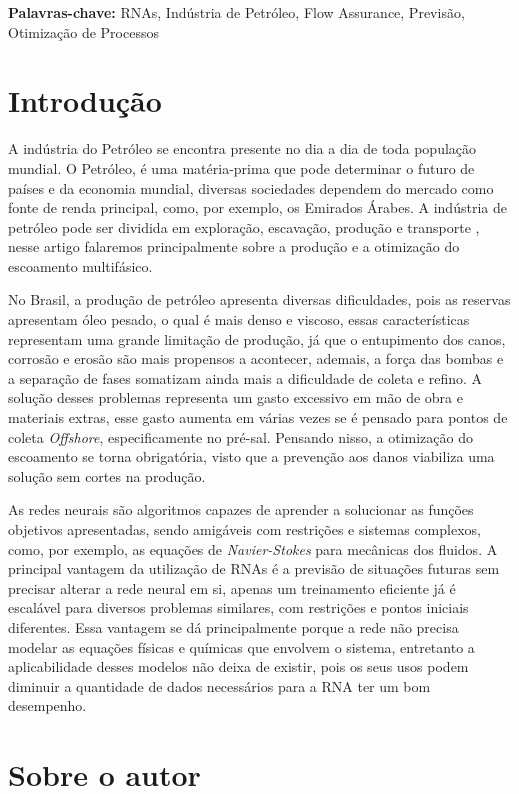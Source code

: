 \documentclass{article}[12pt, openright, oneside, a4paper, portuguese]
\begin{document}
    \textbf{Palavras-chave:} RNAs, Indústria de Petróleo, Flow Assurance, Previsão, Otimização de Processos

\section{Introdução}

    A indústria do Petróleo se encontra presente no dia a dia de toda população mundial. O Petróleo, é uma matéria-prima que pode determinar o futuro de países e da economia mundial, diversas sociedades dependem do mercado como fonte de renda principal, como, por exemplo, os Emirados Árabes. A indústria de petróleo pode ser dividida em exploração, escavação, produção e transporte \cite{Solomon2024}, nesse artigo falaremos principalmente sobre a produção e a otimização do escoamento multifásico.
    
    No Brasil, a produção de petróleo apresenta diversas dificuldades, pois as reservas apresentam óleo pesado, o qual é mais denso e viscoso, essas características representam uma grande limitação de produção, já que o entupimento dos canos, corrosão e erosão são mais propensos a acontecer, ademais, a força das bombas e a separação de fases somatizam ainda mais a dificuldade de coleta e refino. A solução desses problemas representa um gasto excessivo em mão de obra e materiais extras, esse gasto aumenta em várias vezes se é pensado para pontos de coleta \textit{Offshore}, especificamente no pré-sal. Pensando nisso, a otimização do escoamento se torna obrigatória, visto que a prevenção aos danos viabiliza uma solução sem cortes na produção.
    
    As redes neurais são algoritmos capazes de aprender a solucionar as funções objetivos apresentadas, sendo amigáveis com restrições e sistemas complexos, como, por exemplo, as equações de \textit{Navier-Stokes} para mecânicas dos fluidos. A principal vantagem da utilização de RNAs é a previsão de situações futuras sem precisar alterar a rede neural em si, apenas um treinamento eficiente já é escalável para diversos problemas similares, com restrições e pontos iniciais diferentes. Essa vantagem se dá principalmente porque a rede não precisa modelar as equações físicas e químicas que envolvem o sistema, entretanto a aplicabilidade desses modelos não deixa de existir, pois os seus usos podem diminuir a quantidade de dados necessários para a RNA ter um bom desempenho.


\section{Sobre o autor}
\end{document}
